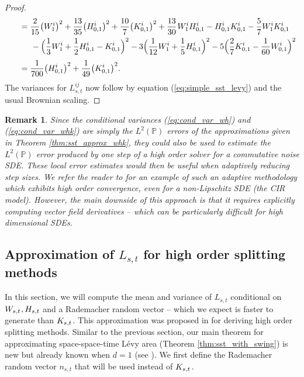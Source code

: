 \documentclass[sn-mathphys-num]{sn-jnl}%
\newtheorem{remark}{Remark}%
\newcommand{\m}{\hspace{0.25mm}}
\newcommand{\mm}{\hspace{5mm}}
\begin{document}
\begin{proof}
\begin{align*}
&\mm = \frac{2}{15}\big(W_1^i\big)^2 + \frac{13}{35}\big(H_{0,1}^i\big)^2 + \frac{10}{7}\big(K_{0,1}^i\big)^2 + \frac{13}{30}\m W_1^i H_{0,1}^i - H_{0,1}^i K_{0,1}^i - \frac{5}{7}W_1^i K_{0,1}^i\\
&\mm\mm - \Big(\frac{1}{3}W_1^i + \frac{1}{2}H_{0,1}^i - K_{0,1}^i\Big)^2 - 3\Big(\frac{1}{12}W_1^i + \frac{1}{5}H_{0,1}^i\Big)^2 - 5\Big(\frac{2}{7}K_{0,1}^i - \frac{1}{60} W_{0,1}^i\Big)^2\\[3pt]
&\mm = \frac{1}{700}\big(H_{0,1}^i\big)^2 + \frac{1}{49}\big(K_{0,1}^i\big)^2.
\end{align*}
The variances for $L_{s,t}^{ij}$ now follow by equation (\ref{eq:simple_sst_levy}) and the usual Brownian scaling.
\end{proof}\vspace{1mm}

\begin{remark}
Since the conditional variances (\ref{eq:cond_var_wh}) and (\ref{eq:cond_var_whk}) are simply the $L^2(\mathbb{P})$ errors of the approximations given in Theorem \ref{thm:sst_approx_whk}, they could also be used to estimate the $L^2(\mathbb{P})$ error produced by one step of a high order solver for a commutative noise SDE. These local error estimates would then be useful when adaptively reducing step sizes.
We refer the reader to \cite[Chapter 6]{foster2020thesis} for an example of such an adaptive methodology which exhibits high order convergence, even for a non-Lipschitz SDE (the CIR model).
However, the main downside of this approach is that it requires explicitly computing vector field derivatives -- which can be particularly difficult for high dimensional SDEs.
\end{remark}

\subsection{Approximation of $L_{s,t}$ for high order splitting methods}\label{sect:sst_splitting}

In this section, we will compute the mean and variance of $L_{s,t}$ conditional on $W_{s,t}\m, H_{s,t}$ and a Rademacher random vector -- which we expect is faster to generate than $K_{s,t}\m$.
This approximation was proposed in \cite{foster2024splitting} for deriving high order splitting methods.
Similar to the previous section, our main theorem for approximating space-space-time L\'{e}vy area (Theorem \ref{thm:sst_with_swing}) is new but already known when $d=1$ (see \cite[Theorem B.4]{foster2024splittingarxiv}).
We first define the Rademacher random vector $n_{s,t}$ that will be used instead of $K_{s,t}\m$.
\medbreak
\end{document}
